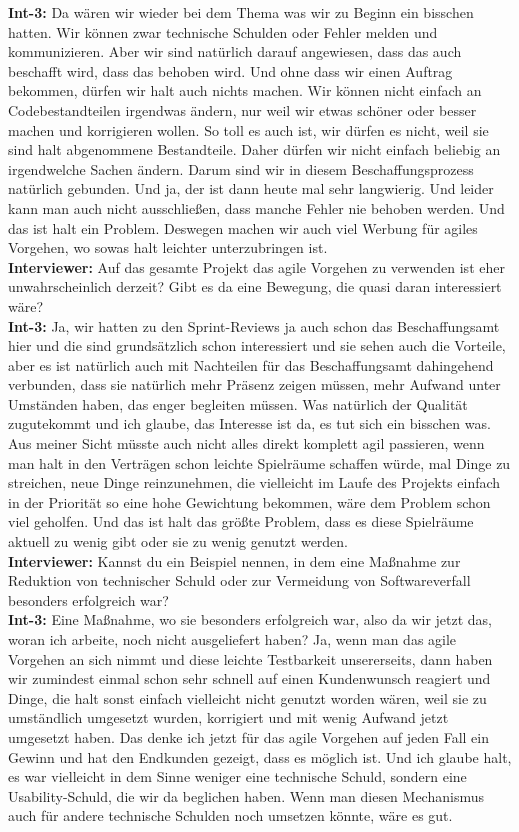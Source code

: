 \textbf{Int-3:} Da wären wir wieder bei dem Thema was wir zu Beginn ein bisschen hatten. Wir können zwar technische Schulden oder Fehler melden und kommunizieren. Aber wir sind natürlich darauf angewiesen, dass das auch beschafft wird, dass das behoben wird. Und ohne dass wir einen Auftrag bekommen, dürfen wir halt auch nichts machen. Wir können nicht einfach an Codebestandteilen irgendwas ändern, nur weil wir etwas schöner oder besser machen und korrigieren wollen. So toll es auch ist, wir dürfen es nicht, weil sie sind halt abgenommene Bestandteile. Daher dürfen wir nicht einfach beliebig an irgendwelche Sachen ändern. Darum sind wir in diesem Beschaffungsprozess natürlich gebunden. Und ja, der ist dann heute mal sehr langwierig. Und leider kann man auch nicht ausschließen, dass manche Fehler nie behoben werden. Und das ist halt ein Problem. Deswegen machen wir auch viel Werbung für agiles Vorgehen, wo sowas halt leichter unterzubringen ist.\\
\textbf{Interviewer:} Auf das gesamte Projekt das agile Vorgehen zu verwenden ist eher unwahrscheinlich derzeit? Gibt es da eine Bewegung, die quasi daran interessiert wäre?\\
\textbf{Int-3:} Ja, wir hatten zu den Sprint-Reviews ja auch schon das Beschaffungsamt hier und die sind grundsätzlich schon interessiert und sie sehen auch die Vorteile, aber es ist natürlich auch mit Nachteilen für das Beschaffungsamt dahingehend verbunden, dass sie natürlich mehr Präsenz zeigen müssen, mehr Aufwand unter Umständen haben, das enger begleiten müssen. Was natürlich der Qualität zugutekommt und ich glaube, das Interesse ist da, es tut sich ein bisschen was. Aus meiner Sicht müsste auch nicht alles direkt komplett agil passieren, wenn man halt in den Verträgen schon leichte Spielräume schaffen würde, mal Dinge zu streichen, neue Dinge reinzunehmen, die vielleicht im Laufe des Projekts einfach in der Priorität so eine hohe Gewichtung bekommen, wäre dem Problem schon viel geholfen. Und das ist halt das größte Problem, dass es diese Spielräume aktuell zu wenig gibt oder sie zu wenig genutzt werden.\\
\textbf{Interviewer:} Kannst du ein Beispiel nennen, in dem eine Maßnahme zur Reduktion von technischer Schuld oder zur Vermeidung von Softwareverfall besonders erfolgreich war? \\
\textbf{Int-3:} Eine Maßnahme, wo sie besonders erfolgreich war, also da wir jetzt das, woran ich arbeite, noch nicht ausgeliefert haben? Ja, wenn man das agile Vorgehen an sich nimmt und diese leichte Testbarkeit unsererseits, dann haben wir zumindest einmal schon sehr schnell auf einen Kundenwunsch reagiert und Dinge, die halt sonst einfach vielleicht nicht genutzt worden wären, weil sie zu umständlich umgesetzt wurden, korrigiert und mit wenig Aufwand jetzt umgesetzt haben. Das denke ich jetzt für das agile Vorgehen auf jeden Fall ein Gewinn und hat den Endkunden gezeigt, dass es möglich ist. Und ich glaube halt, es war vielleicht in dem Sinne weniger eine technische Schuld, sondern eine Usability-Schuld, die wir da beglichen haben. Wenn man diesen Mechanismus auch für andere technische Schulden noch umsetzen könnte, wäre es gut. \\
